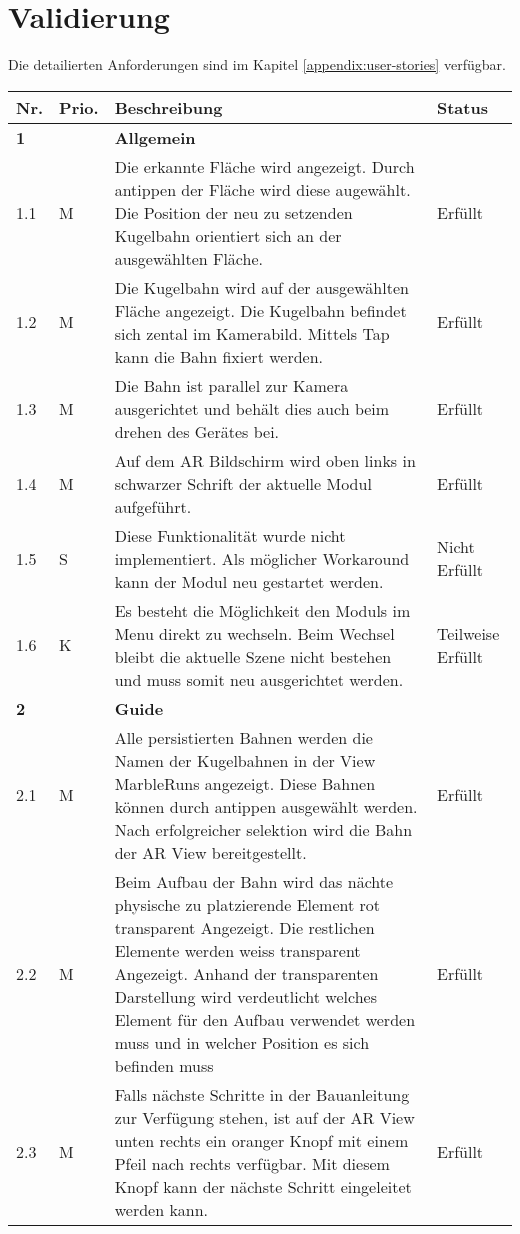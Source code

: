 \section{Validierung}

Die detailierten Anforderungen sind im Kapitel \ref{appendix:user-stories} verfügbar.

\begin{longtable}{l l p{10cm} l}
	\hline
	\textbf{Nr.} & \textbf{Prio.} & \textbf{Beschreibung} & \textbf{Status} \\
	\hline
	\textbf{1} & & \textbf{Allgemein} & \\
	\hline
	1.1 & M & Die erkannte Fläche wird angezeigt. Durch antippen der Fläche wird diese augewählt. Die Position der neu zu setzenden Kugelbahn orientiert sich an der ausgewählten Fläche. & Erfüllt \\
	1.2 & M & Die Kugelbahn wird auf der ausgewählten Fläche angezeigt. Die Kugelbahn befindet sich zental im Kamerabild. Mittels Tap kann die Bahn fixiert werden. & Erfüllt \\
	1.3 & M & Die Bahn ist parallel zur Kamera ausgerichtet und behält dies auch beim drehen des Gerätes bei. & Erfüllt \\
	1.4 & M & Auf dem AR Bildschirm wird oben links in schwarzer Schrift der aktuelle Modul aufgeführt. & Erfüllt \\
	1.5 & S & Diese Funktionalität wurde nicht implementiert. Als möglicher Workaround kann der Modul neu gestartet werden. & Nicht Erfüllt \\
	1.6 & K & Es besteht die Möglichkeit den Moduls im Menu direkt zu wechseln. Beim Wechsel bleibt die aktuelle Szene nicht bestehen und muss somit neu ausgerichtet werden. & Teilweise Erfüllt \\
	\hline
	\textbf{2} & & \textbf{Guide} & \\
	\hline
	2.1 & M & Alle persistierten Bahnen werden die Namen der Kugelbahnen in der View MarbleRuns angezeigt. Diese Bahnen können durch antippen ausgewählt werden. Nach erfolgreicher selektion wird die Bahn der AR View bereitgestellt. & Erfüllt \\
	2.2 & M & Beim Aufbau der Bahn wird das nächte physische zu platzierende Element rot transparent Angezeigt. Die restlichen Elemente werden weiss transparent Angezeigt. Anhand der transparenten Darstellung wird verdeutlicht welches Element für den Aufbau verwendet werden muss und in welcher Position es sich befinden muss  & Erfüllt \\
	2.3 & M & Falls nächste Schritte in der Bauanleitung zur Verfügung stehen, ist auf der AR View unten rechts ein oranger Knopf mit einem Pfeil nach rechts verfügbar. Mit diesem Knopf kann der nächste Schritt eingeleitet werden kann. & Erfüllt \\

\end{longtable}
